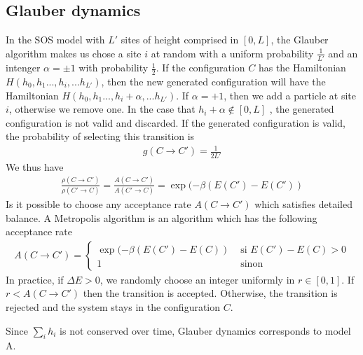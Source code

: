     \subsection{Glauber dynamics}

In the SOS model with $L'$ sites of height comprised in $[0,L]$, the Glauber algorithm \cite{glauber_timedependent_1963} makes us chose a site $i$ at random with a uniform probability $\frac{1}{L'}$ and an intenger $\alpha = \pm 1$ with probability $\frac{1}{2}$. If the configuration $C$ has the Hamiltonian $H(h_0,h_1...,h_i,...h_{L'})$, then the new generated configuration will have the Hamiltonian $H(h_0,h_1...,h_i+\alpha,...h_{L'})$.
If $\alpha=+1$, then we add a particle at site $i$, otherwise we remove one. In the case that $h_i+\alpha \not\in [0,L]$ , the generated configuration is not valid and discarded.
If the generated configuration is valid, the probability of selecting this transition is
\begin{align}
    g(C\to C') = \frac{1}{2L'}
\end{align}
We thus have
\begin{align}
    \frac{\rho(C\to C')}{\rho(C' \to C)} = \frac{A(C\to C')}{A(C'\to C)} = \exp(-\beta (E(C')-E(C'))
\end{align}
Is it possible to choose any acceptance rate $A(C\to C')$ which satisfies detailed balance. A Metropolis algorithm is an algorithm which has the following acceptance rate
\begin{align}
    A(C\to C') = \begin{cases} \exp(-\beta (E(C')-E(C)) &\text{ si } E(C')-E(C) \greater 0 \\
             1 &\text{ sinon} \end{cases}
    \label{taux-transition-metropolis}
\end{align}
In practice, if $\Delta E \greater 0$, we randomly choose an integer uniformly in $r\in[0,1]$. If $r\less A(C\to C') $ then the transition is accepted. Otherwise, the transition is rejected and the system stays in the configuration $C$.

Since $\sum_i h_i$ is not conserved over time, Glauber dynamics corresponds to model A.

